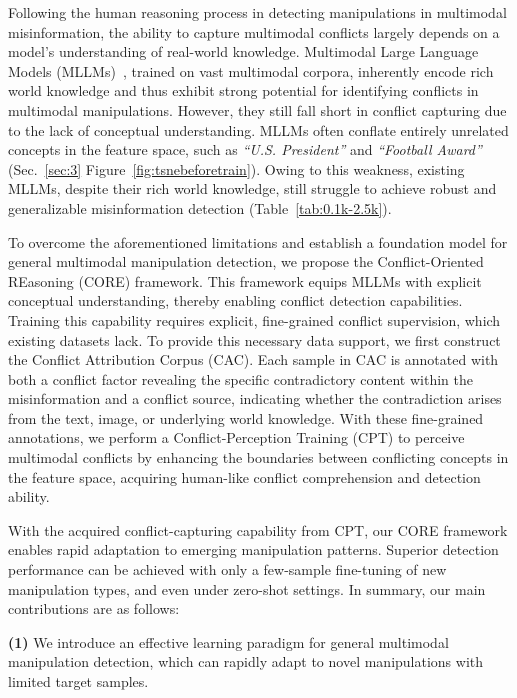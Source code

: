 \documentclass{article}
\theoremstyle{plain}
\theoremstyle{definition}
\theoremstyle{remark}
\begin{document}
Following the human reasoning process in detecting manipulations in multimodal misinformation, the ability to capture multimodal conflicts largely depends on a model's understanding of real-world knowledge. Multimodal Large Language Models (MLLMs)~\cite{qwen2.5vl,gemma3,llama3.2,seedvl}, trained on vast multimodal corpora, inherently encode rich world knowledge and thus exhibit strong potential for identifying conflicts in multimodal manipulations. However, they still fall short in conflict capturing due to the lack of conceptual understanding. MLLMs often conflate entirely unrelated concepts in the feature space, such as \textit{``U.S. President''} and \textit{``Football Award''} (Sec.~\ref{sec:3} Figure~\ref{fig:tsnebeforetrain}). Owing to this weakness, 
existing MLLMs, despite their rich world knowledge, still struggle to achieve robust and generalizable misinformation detection (Table~\ref{tab:0.1k-2.5k}).

To overcome the aforementioned limitations and establish a foundation model for general multimodal manipulation detection, we propose the Conflict-Oriented REasoning (CORE) framework. This framework equips MLLMs with explicit conceptual understanding, thereby enabling conflict detection capabilities. Training this capability requires explicit, fine-grained conflict supervision, which existing datasets lack. To provide this necessary data support, we first construct the Conflict Attribution Corpus (CAC). Each sample in CAC is annotated with both a conflict factor revealing the specific contradictory content within the misinformation and a conflict source, indicating whether the contradiction arises from the text, image, or underlying world knowledge. With these fine-grained annotations, we perform a Conflict-Perception Training (CPT) to perceive multimodal conflicts by enhancing the boundaries between conflicting concepts in the feature space, acquiring human-like conflict comprehension and detection ability.

With the acquired conflict-capturing capability from CPT, our CORE framework enables rapid adaptation to emerging manipulation patterns. Superior detection performance can be achieved with only a few-sample fine-tuning of new manipulation types, and even under zero-shot settings.
In summary, our main contributions are as follows:

\textbf{(1)}  We introduce an effective learning paradigm for general multimodal manipulation detection, which can rapidly adapt to novel manipulations with limited target samples. 
\end{document}
